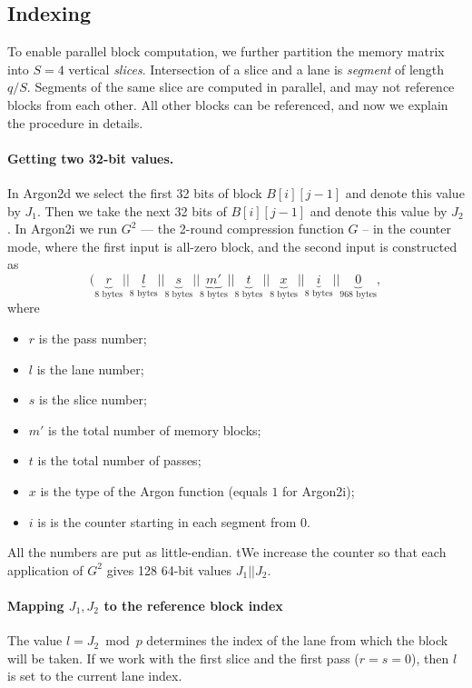 \documentclass[a4paper]{article}
\begin{document}
\subsection{Indexing}\label{sec:index}

To enable parallel block computation, we further partition the memory matrix into  $S=4$ vertical \emph{slices}. Intersection of a slice and a lane is \emph{segment} of length $q/S$.  Segments of the same slice
  are computed in parallel, and may not reference blocks from each other. All other blocks can be referenced, and now we explain the procedure in details.

\paragraph{Getting two 32-bit values.} In Argon2d we select  the first 32 bits of  block $B[i][j-1]$ and denote this value by $J_1$. Then we take the next 32 bits of $B[i][j-1]$ and denote this value by $J_2$. In \textsf{Argon2i} we run $G^2$ --- the 2-round compression function $G$ -- in the counter mode, where the first input is all-zero block, and the second input is constructed as 
  $$
  (\underbrace{r}_{\text{8 bytes}}||\underbrace{l}_{\text{8 bytes}}||\underbrace{s}_{\text{8 bytes}}||\underbrace{m'}_{\text{8 bytes}}||\underbrace{t}_{\text{8 bytes}}||\underbrace{x}_{\text{8 bytes}}||\underbrace{i}_{\text{8 bytes}}||\underbrace{0}_{\text{968 bytes}},
  $$ where
  \begin{itemize}
  \item $r$ is the pass number;
  \item $l$ is the lane number;
  \item $s$ is the slice number;
  \item $m'$ is the total number of memory blocks;
  \item $t$ is the total number of passes;
  \item $x$ is the type of the Argon function (equals $1$ for \textsf{Argon2i});
  \item $i$ is is the counter starting in each segment from 0.
  \end{itemize} All the numbers are put as little-endian. tWe increase the counter so that each application of $G^2$ gives 128 64-bit values $J_1||J_2$.
  
 \paragraph{Mapping $J_1,J_2$ to the reference block index} The value $l = J_2 \bmod p$ determines the index of the lane from which the block will be taken. If we work with the first slice and the first pass ($r=s=0$), then $l$ is set to the current lane index.  
 
\end{document}

